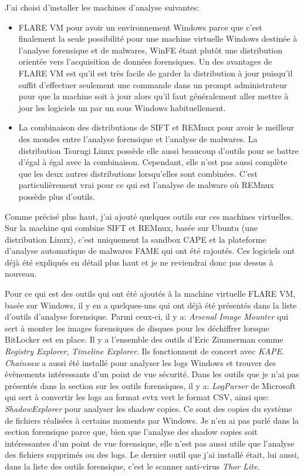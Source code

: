 J'ai choisi d'installer les machines d'analyse suivantes:

\begin{itemize}
    \item FLARE VM pour avoir un environnement Windows parce que c'est finalement la seule possibilité pour une machine virtuelle Windows destinée à l'analyse forensique et de malwares, WinFE étant plutôt une distribution orientée vers l'acquisition de données forensiques. Un des avantages de FLARE VM est qu'il est très facile de garder la distribution à jour puisqu'il suffit d'effectuer seulement une commande dans un prompt administrateur pour que la machine soit à jour alors qu'il faut généralement aller mettre à jour les logiciels un par un sous Windows habituellement.
    \item La combinaison des distributions de SIFT et REMnux pour avoir le meilleur des mondes entre l'analyse forensique et l'analyse de malwares. La distribution Tsurugi Linux possède elle aussi beaucoup d'outils pour se battre d'égal à égal avec la combinaison. Cependant, elle n'est pas aussi complète que les deux autres distributions lorsqu'elles sont combinées. C'est particulièrement vrai pour ce qui est l'analyse de malware où REMnux possède plus d'outils.
\end{itemize}

Comme précisé plus haut, j'ai ajouté quelques outils sur ces machines virtuelles. Sur la machine qui combine SIFT et REMnux, basée sur Ubuntu (une distribution Linux), c'est uniquement la sandbox CAPE et la plateforme d'analyse automatique de malwares FAME qui ont été rajoutés. Ces logiciels ont déjà été expliqués en détail plus haut et je ne reviendrai donc pas dessus à nouveau.

Pour ce qui est des outils qui ont été ajoutés à la machine virtuelle FLARE VM, basée sur Windows, il y en a quelques-uns qui ont déjà été présentés dans la liste d'outils d'analyse forensique. Parmi ceux-ci, il y a: \textit{Arsenal Image Mounter} qui sert à monter les images forensiques de disques pour les déchiffrer lorsque BitLocker est en place. Il y a l'ensemble des outils d’Eric Zimmerman comme \textit{Registry Explorer}, \textit{Timeline Explorer}. Ils fonctionnent de concert avec \textit{KAPE}. \textit{Chainsaw} a aussi été installé pour analyser les logs Windows et trouver des évènements intéressants d'un point de vue sécurité. Dans les outils que je n'ai pas présentés dans la section sur les outils forensiques, il y a: \textit{LogParser} de Microsoft qui sert à convertir les logs au format evtx vert le format CSV, ainsi que: \textit{ShadowExplorer} pour analyser les shadow copies. Ce sont des copies du système de fichiers réalisées à certains moments par Windows. Je n'en ai pas parlé dans la section forensique parce que, bien que l'analyse des shadow copies soit intéressantes d'un point de vue forensique, elle n'est pas aussi utile que l'analyse des fichiers supprimés ou des logs. Le dernier outil que j'ai installé était, lui aussi, dans la liste des outils forensique, c'est le scanner anti-virus \textit{Thor Lite}.

